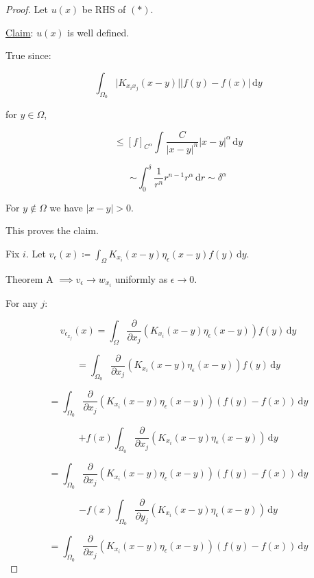 \documentclass{article}
\theoremstyle{definition}
\begin{document}
\begin{proof}

    Let \(u(x)\) be RHS of \((\ast)\).

    \underline{Claim}: \(u(x)\) is well defined.
    
    True since:

    \[
        \int_{\Omega_0} \vert K_{x_i x_j} (x-y) \vert \vert f(y) - f(x) \vert \,\mathrm{d}y 
    \]

    for \(y\in \Omega\),

    \[
        \leq [f]_{C^\alpha} \int \frac{C}{\vert x-y \vert^n} \vert x-y \vert ^\alpha \,\mathrm{d}y
    \]

    \[
        \sim \int_{0}^{\delta} \frac{1}{r^n}r^{n-1} r^\alpha \,\mathrm{d}r \sim \delta^\alpha
    \]

    For \(y\notin \Omega\) we have \(\vert x-y \vert > 0\).

    This proves the claim.

    Fix \(i\). Let \(v_{\epsilon} (x) \coloneqq \int_{\Omega} K_{x_i} (x-y) \eta_{\epsilon} (x-y) f(y) \,\mathrm{d}y \).

    Theorem A \(\implies v_{\epsilon} \to w_{x_i}\) uniformly as \(\epsilon \to 0\).

    For any \(j\):

    \[
        v_{\epsilon_{x_j}} (x) = \int_{\Omega} \frac{\partial}{\partial x_j} \left( K_{x_i} (x-y) \eta _\epsilon (x-y) \right) f(y) \,\mathrm{d}y  
    \]

    \[
        = \int_{\Omega_0} \frac{\partial}{\partial x_j} \left( K_{x_i} (x-y) \eta _\epsilon (x-y) \right) f(y) \,\mathrm{d}y 
    \]

    \[
        =\int_{\Omega_0} \frac{\partial}{\partial x_j} \left( K_{x_i} (x-y) \eta_{\epsilon} (x-y) \right) (f(y) - f(x)) \,\mathrm{d}y 
    \]

    \[
        + f(x) \int_{\Omega_0} \frac{\partial}{\partial x_j} (K_{x_i}(x-y) \eta_{\epsilon} (x-y)) \,\mathrm{d}y
    \]

    \[
        =\int_{\Omega_0} \frac{\partial}{\partial x_j} \left( K_{x_i} (x-y) \eta_{\epsilon} (x-y) \right) (f(y) - f(x)) \,\mathrm{d}y 
    \]

    \[
        - f(x) \int_{\Omega_0} \frac{\partial}{\partial y_j} (K_{x_i}(x-y) \eta_{\epsilon} (x-y)) \,\mathrm{d}y
    \]

    \[
        =\int_{\Omega_0} \frac{\partial}{\partial x_j} \left( K_{x_i} (x-y) \eta_{\epsilon} (x-y) \right) (f(y) - f(x)) \,\mathrm{d}y 
    \]


\end{proof}
\end{document}
